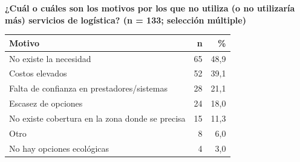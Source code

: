 \bigskip
\noindent\textbf{¿Cuál o cuáles son los motivos por los que no utiliza (o no utilizaría más) servicios de logística? (n = 133; selección múltiple)}

\begin{center}
\begin{tabular}{lrr}
	\toprule
	\textbf{Motivo} & \textbf{n} & \textbf{\%} \\
	\midrule
	No existe la necesidad                              & 65 & 48,9 \\
	Costos elevados                                     & 52 & 39,1 \\
	Falta de confianza en prestadores/sistemas          & 28 & 21,1 \\
	Escasez de opciones                                 & 24 & 18,0 \\
	No existe cobertura en la zona donde se precisa     & 15 & 11,3 \\
	Otro                                                &  8 &  6,0 \\
	No hay opciones ecológicas                          &  4 &  3,0 \\
	\bottomrule
\end{tabular}
\end{center}
